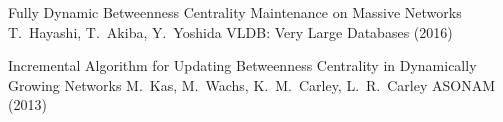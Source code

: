 \begin{frame}
  \centering
  \vfill
  {\huge Fully Dynamic Betweenness Centrality Maintenance on Massive
  Networks}
  \vfill
  {\Large T.~Hayashi, T.~Akiba, Y.~Yoshida}
  \vfill
  {\large VLDB: Very Large Databases (2016)}
  \vfill
\end{frame}

\begin{frame}
  \centering
  \vfill
  {\huge Incremental Algorithm for Updating Betweenness Centrality in
  Dynamically Growing Networks}
  \vfill
  {\Large M.~Kas, M.~Wachs, K.~M.~Carley, L.~R.~Carley}
  \vfill
  {\large ASONAM (2013)}
  \vfill
\end{frame}
